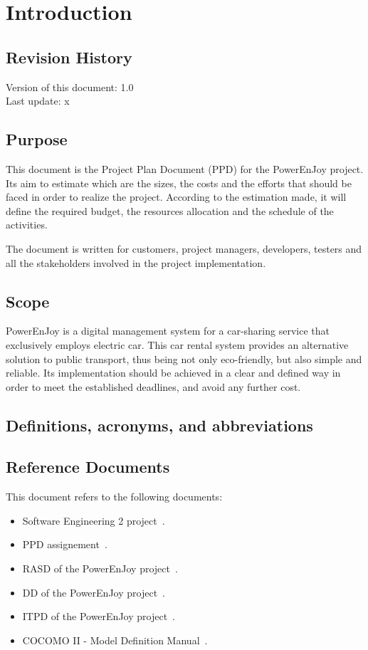 \section{Introduction}

\subsection{Revision History}

Version of this document: 1.0 \\
Last update: x

\subsection{Purpose}

This document is the Project Plan Document (PPD) for the PowerEnJoy project. Its aim to estimate which are the sizes, the costs and the efforts that should be faced in order to realize the project. According to the estimation made, it will define the required budget, the resources allocation and the schedule of the activities.

The document is written for customers, project managers, developers, testers and all the stakeholders involved in the project implementation.

\subsection{Scope}

PowerEnJoy is a digital management system for a car-sharing service that exclusively employs electric car. This car rental system provides an alternative solution to public transport, thus being not only eco-friendly, but also simple and reliable. Its implementation should be achieved in a clear and defined way in order to meet the established deadlines, and avoid any further cost.

\subsection{Definitions, acronyms, and abbreviations}



\subsection{Reference Documents}

This document refers to the following documents:
\begin{itemize}
	\item Software Engineering 2 project~\cite{se-project-rules}.
	\item PPD assignement~\cite{se-ppd}.
	\item RASD of the PowerEnJoy project~\cite{power-rasd}.
	\item DD of the PowerEnJoy project~\cite{power-dd}.
	\item ITPD of the PowerEnJoy project~\cite{power-itpd}.
	\item COCOMO II - Model Definition Manual~\cite{cocomo}.
\end{itemize}